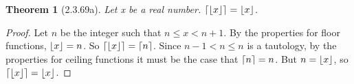 \documentclass[a4paper, 12pt]{article}
\theoremstyle{plain}
\newtheorem*{theorem*}{Theorem}
\DeclarePairedDelimiter{\floor}{\lfloor}{\rfloor}
\DeclarePairedDelimiter{\ceil}{\lceil}{\rceil}
\begin{document}
	
	\begin{theorem*}[2.3.69a]
		Let x be a real number. $\ceil{\floor{x}} = \floor{x}$.
	\end{theorem*}
	
	\begin{proof}
		Let $n$ be the integer such that $n \le x < n+1$. By the properties for floor functions, $\floor{x} = n$. So $\ceil{\floor{x}} = \ceil{n}$. Since $n-1 < n \le n$ is a tautology, by the properties for ceiling functions it must be the case that $\ceil{n} = n$. But $n = \floor{x}$, so $\ceil{\floor{x}} = \floor{x}$.
	\end{proof}
\end{document}
